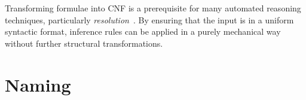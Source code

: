 Transforming formulae into CNF is a prerequisite for many automated reasoning techniques, particularly \textit{resolution}~\cite{chang1997}.  
By ensuring that the input is in a uniform syntactic format, inference rules can be applied in a purely mechanical way without further structural transformations.



\section{Naming}




